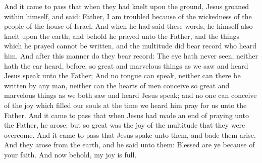And it came to pass that when they had knelt upon the ground, Jesus groaned within himself, and said: Father, I am troubled because of the wickedness of the people of the house of Israel.
\bverse \iffalse And when he had said these words, he himself also knelt upon the earth; and behold he prayed unto the Father, and the things which he prayed cannot be written, and the multitude did bear record who heard him. \fi
And when he had said these words, he himself also knelt upon the earth; and behold he prayed unto the Father, and the things which he prayed cannot be written, and the multitude did bear record who heard him.
\bverse \iffalse And after this manner do they bear record: The eye hath never seen, neither hath the ear heard, before, so great and marvelous things as we saw and heard Jesus speak unto the Father; \fi
And after this manner do they bear record: The eye hath never seen, neither hath the ear heard, before, so great and marvelous things as we saw and heard Jesus speak unto the Father;
\bverse \iffalse And no tongue can speak, neither can there be written by any man, neither can the hearts of men conceive so great and marvelous things as we both saw and heard Jesus speak; and no one can conceive of the joy which filled our souls at the time we heard him pray for us unto the Father. \fi
And no tongue can speak, neither can there be written by any man, neither can the hearts of men conceive so great and marvelous things as we both saw and heard Jesus speak; and no one can conceive of the joy which filled our souls at the time we heard him pray for us unto the Father.
\bverse \iffalse And it came to pass that when Jesus had made an end of praying unto the Father, he arose; but so great was the joy of the multitude that they were overcome. \fi
And it came to pass that when Jesus had made an end of praying unto the Father, he arose; but so great was the joy of the multitude that they were overcome.
\bverse \iffalse And it came to pass that Jesus spake unto them, and bade them arise. \fi
And it came to pass that Jesus spake unto them, and bade them arise.
\bverse \iffalse And they arose from the earth, and he said unto them: Blessed are ye because of your faith. And now behold, my joy is full. \fi
And they arose from the earth, and he said unto them: Blessed are ye because of your faith. And now behold, my joy is full.
\bverse \iffalse And when he had said these words, he wept, and the multitude bare record of it, and he took their little children, one by one, and blessed them, and prayed unto the Father for them. \fi
